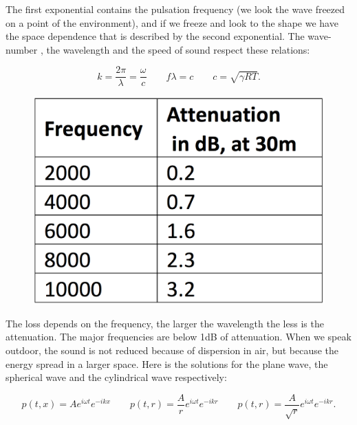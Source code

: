 	The first exponential contains the pulsation frequency (we look the wave freezed on a point of the environment), and if we freeze and look to the shape we have the space dependence that is described by the second exponential. The wave-number , the wavelength and the speed of sound respect these relations: 
	
	\begin{equation}
	k = \frac{2\pi}{\lambda}= \frac{\omega}{c} \qquad f\lambda = c \qquad c = \sqrt{\gamma RT}. 
	\end{equation}
	
	\begin{figure}
	\vspace{-5mm}
	\includegraphics[scale=0.2]{acoustics/ch1/6}
	\label{fig:1.6}
	\end{figure}
	The loss depends on the frequency, the larger the wavelength the less is the attenuation. The major frequencies are below 1dB of attenuation. When we speak outdoor, the sound is not reduced because of dispersion in air, but because the energy spread in a larger space. Here is the solutions for the plane wave, the spherical wave and the cylindrical wave respectively:
	
	\begin{equation}
	p(t, x) = A e^{i\omega t} e^{-ikx} \qquad p(t, r) = \frac{A}{r} e^{i\omega t} e^{-ikr} \qquad p(t, r) = \frac{A}{\sqrt{r}} e^{i\omega t} e^{-ikr}.
	\end{equation}
	
